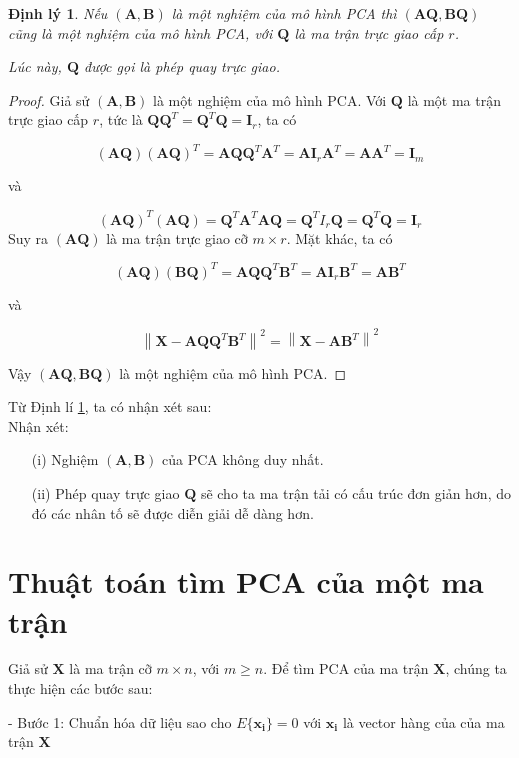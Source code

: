 \documentclass[12pt,a4paper,oneside]{report}
\newtheorem{dl}{Định lý}[section]
\numberwithin{equation}{section}
\begin{document}
\begin{dl} \label{dl351}
Nếu $(\mathbf{A, B})$ là một nghiệm của mô hình PCA thì $(\mathbf{A Q, B Q})$ cũng là một nghiệm của mô hình PCA, với $\mathbf{Q}$ là ma trận trực giao cấp $r$.

Lúc này, $\mathbf{Q}$ được gọi là phép quay trực giao.
\end{dl}
\begin{proof}
Giả sử $(\mathbf{A, B})$ là một nghiệm của mô hình PCA.
Với $\mathbf{Q}$ là một ma trận trực giao cấp $r$, tức là $\mathbf{Q Q}^{T}=\mathbf{Q}^{T} \mathbf{Q}=\mathbf{I}_{r}$, ta có

$$
(\mathbf{A Q})(\mathbf{A Q})^{T}=\mathbf{A Q Q}^{T} \mathbf{A}^{T}=\mathbf{AI}_{r} \mathbf{A}^{T}=\mathbf{A A}^{T}=\mathbf{I}_{m}
$$

và

$$
(\mathbf{A Q})^{T}(\mathbf{A Q})=\mathbf{Q}^{T} \mathbf{A}^{T} \mathbf{A Q}=\mathbf{Q}^{T} I_{r} \mathbf{Q}=\mathbf{Q}^{T} \mathbf{Q}=\mathbf{I}_{r}
$$
Suy ra $(\mathbf{A Q})$ là ma trận trực giao cỡ $m \times r$.
Mặt khác, ta có

$$
(\mathbf{A Q})(\mathbf{B Q})^{T}=\mathbf{A Q Q}^{T} \mathbf{B}^{T}=\mathbf{A I}_{r} \mathbf{B}^{T}=\mathbf{A B}^{T}
$$

và

$$
\left\|\mathbf{X-A Q Q}^{T} \mathbf{B}^{T}\right\|^{2}=\left\|\mathbf{X-A B}^{T}\right\|^{2}
$$

Vậy $(\mathbf{A Q, B Q})$ là một nghiệm của mô hình PCA.
\end{proof}
Từ Định lí \ref{dl351}, ta có nhận xét sau:\\
Nhận xét: 
\begin{itemize}
\item[(i)] Nghiệm $(\mathbf{A, B})$ của PCA không duy nhất.
\item[(ii)] Phép quay trực giao $\mathbf{Q}$ sẽ cho ta ma trận tải có cấu trúc đơn giản hơn, do đó các nhân tố sẽ được diễn giải dễ dàng hơn.
\end{itemize}
\section{Thuật toán tìm PCA của một ma trận}

Giả sử $\mathbf{X}$ là ma trận cỡ $m \times n$, với $m \geq n$. Để tìm $\mathrm{PCA}$ của ma trận $\mathbf{X}$, chúng ta thực hiện các bước sau:

- Bước 1: Chuẩn hóa dữ liệu sao cho $E\{\mathbf{x_i}\}=0$ với $\mathbf{x_i}$ là vector hàng của của ma trận $\mathbf{X}$
\end{document}
